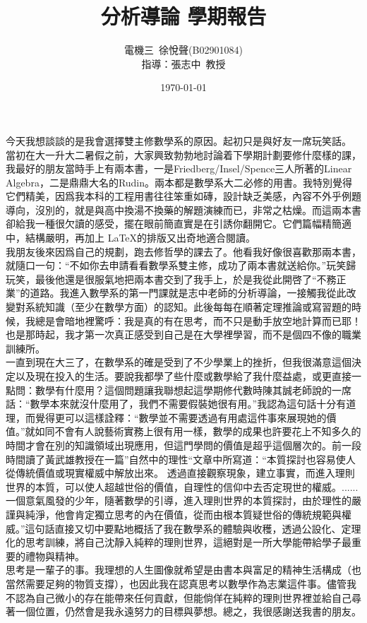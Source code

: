 \documentclass[12pt]{article}
\title{\textbf{分析導論 學期報告}}  %
\author{電機三~徐悅聲(B02901084)\\指導：張志中~教授}      %
\date{\today}      %
\begin{document}
\maketitle                   %

今天我想談談的是我會選擇雙主修數學系的原因。起初只是與好友一席玩笑話。\\

當初在大一升大二暑假之前，大家興致勃勃地討論着下學期計劃要修什麼樣的課，我最好的朋友當時手上有兩本書，一是Friedberg/Insel/Spence三人所著的Linear Algebra，二是鼎鼎大名的Rudin。兩本都是數學系大二必修的用書。我特別覺得它們精美，因爲我本科的工程用書往往笨重如磚，設計缺乏美感，內容不外乎例題導向，沒別的，就是與高中換湯不換藥的解題演練而已，非常之枯燥。而這兩本書卻給我一種很欠讀的感受，擺在眼前簡直實是在引誘你翻開它。它們篇幅精簡適中，結構嚴明，再加上 \LaTeX 的排版又出奇地適合閱讀。\\

我朋友後來因爲自己的規劃，跑去修哲學的課去了。他看我好像很喜歡那兩本書，就隨口一句：“不如你去申請看看數學系雙主修，成功了兩本書就送給你。”玩笑歸玩笑，最後他還是很服氣地把兩本書交到了我手上，於是我從此開啓了“不務正業”的道路。​我進入數學系的第一門課就是志中老師的分析導論，一接觸我從此改變對系統知識（至少在數學方面）的認知。此後每每在順著定理推論或寫習題的時候，我總是會暗地裡驚呼：我是真的有在思考，而不只是動手放空地計算而已耶！也是那時起，我才第一次真正感受到自己是在大學裡學習，而不是個四不像的職業訓練所。\\

一直到現在大三了，在數學系的確是受到了不少學業上的挫折，但我很滿意這個決定以及現在投入的生活。要說我都學了些什麼或數學給了我什麼益處，或更直接一點問：數學有什麼用？這個問題讓我聯想起這學期修代數時陳其誠老師說的一席話：“數學本來就沒什麼用了，我們不需要假裝她很有用。”我認為這句話十分有道理，而覺得更可以這樣詮釋：“數學並不需要透過有用處這件事來展現她的價值。”就如同不會有人說藝術實務上很有用一樣，數學的成果也許要花上不知多久的時間才會在別的知識領域出現應用，但這門學問的價值是超乎這個層次的。前一段時間讀了黃武雄教授在一篇”自然中的理性“文章中所寫道：“本質探討也容易使人從傳統價值或現實權威中解放出來。 透過直接觀察現象，建立事實，而進入理則世界的本質，可以使人超越世俗的價值，自理性的信仰中去否定現世的權威。......一個意氣風發的少年，隨著數學的引導，進入理則世界的本質探討，由於理性的嚴謹與純淨，他會肯定獨立思考的內在價值，從而由根本質疑世俗的傳統規範與權威。”這句話直接又切中要點地概括了我在數學系的體驗與收穫，透過公設化、定理化的思考訓練，將自己沈靜入純粹的理則世界，這絕對是一所大學能帶給學子最重要的禮物與精神。\\

思考是一輩子的事。我理想的人生圖像就希望是由書本與富足的精神生活構成（也當然需要足夠的物質支撐），也因此我在認真思考以數學作為志業這件事。儘管我不認為自己微小的存在能帶來任何貢獻，但能倘佯在純粹的理則世界裡並給自己尋著一個位置，仍然會是我永遠努力的目標與夢想。總之，我很感謝送我書的朋友。
\end{document}
